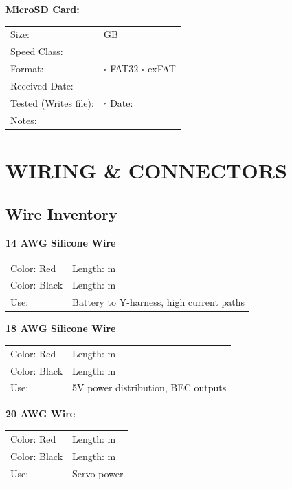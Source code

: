 \documentclass[10pt,letterpaper]{article}
\begin{document}
\textbf{MicroSD Card:}
\begin{tabularx}{\textwidth}{lX}
Size: & \underline{\hspace{4cm}} GB \\
Speed Class: & \underline{\hspace{4cm}} \\
Format: & $\square$ FAT32 $\square$ exFAT \\[0.5em]
Received Date: & \underline{\hspace{4cm}} \\
Tested (Writes file): & $\square$ \quad Date: \underline{\hspace{3cm}} \\
Notes: & \underline{\hspace{10cm}} \\
\end{tabularx}

\newpage

\section*{WIRING \& CONNECTORS}

\subsection*{Wire Inventory}

\textbf{14 AWG Silicone Wire}
\begin{tabularx}{\textwidth}{lX}
Color: Red & Length: \underline{\hspace{3cm}} m \\
Color: Black & Length: \underline{\hspace{3cm}} m \\
Use: & Battery to Y-harness, high current paths \\
\end{tabularx}

\textbf{18 AWG Silicone Wire}
\begin{tabularx}{\textwidth}{lX}
Color: Red & Length: \underline{\hspace{3cm}} m \\
Color: Black & Length: \underline{\hspace{3cm}} m \\
Use: & 5V power distribution, BEC outputs \\
\end{tabularx}

\textbf{20 AWG Wire}
\begin{tabularx}{\textwidth}{lX}
Color: Red & Length: \underline{\hspace{3cm}} m \\
Color: Black & Length: \underline{\hspace{3cm}} m \\
Use: & Servo power \\
\end{tabularx}
\end{document}

